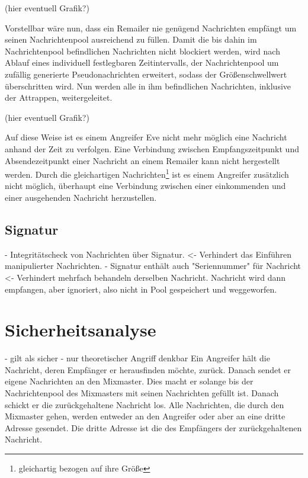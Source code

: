 (hier eventuell Grafik?)

Vorstellbar wäre nun, dass ein Remailer nie genügend Nachrichten empfängt um seinen Nachrichtenpool ausreichend zu füllen. Damit die bis dahin im Nachrichtenpool befindlichen Nachrichten nicht blockiert werden, wird nach Ablauf eines individuell festlegbaren Zeitintervalls, der Nachrichtenpool um zufällig generierte Pseudonachrichten erweitert, sodass der Größenschwellwert überschritten wird. Nun werden alle in ihm befindlichen Nachrichten, inklusive der Attrappen, weitergeleitet. 

(hier eventuell Grafik?)

Auf diese Weise ist es einem Angreifer Eve nicht mehr möglich eine Nachricht anhand der Zeit zu verfolgen. Eine Verbindung zwischen Empfangszeitpunkt und Absendezeitpunkt einer Nachricht an einem Remailer kann nicht hergestellt werden. Durch die gleichartigen Nachrichten\footnote{gleichartig bezogen auf ihre Größe} ist es einem Angreifer zusätzlich nicht möglich, überhaupt eine Verbindung zwischen einer einkommenden und einer ausgehenden Nachricht herzustellen. 


\subsection{Signatur}
- Integritätscheck von Nachrichten über Signatur. <- Verhindert das Einführen manipulierter Nachrichten.
- Signatur enthält auch "Seriennummer" für Nachricht <- Verhindert mehrfach behandeln derselben Nachricht. Nachricht wird dann empfangen, aber ignoriert, also nicht in Pool gespeichert und weggeworfen.

\section{Sicherheitsanalyse}
- gilt als sicher
- nur theoretischer Angriff denkbar
Ein Angreifer hält die Nachricht, deren Empfänger er herausfinden möchte, zurück. Danach sendet er eigene Nachrichten an den Mixmaster. Dies macht er solange bis der Nachrichtenpool des Mixmasters mit seinen Nachrichten gefüllt ist. Danach schickt er die zurückgehaltene Nachricht los. Alle Nachrichten, die durch den Mixmaster gehen, werden entweder an den Angreifer oder aber an eine dritte Adresse gesendet. Die dritte Adresse ist die des Empfängers der zurückgehaltenen Nachricht.